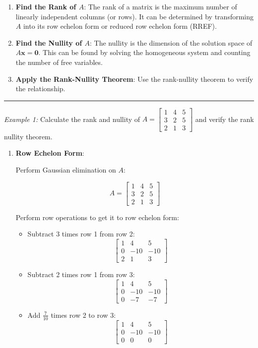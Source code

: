 \documentclass[
  letterpaper,
  DIV=11,
  numbers=noendperiod]{scrreprt}
\theoremstyle{plain}
\theoremstyle{definition}
\theoremstyle{remark}
\begin{document}
\begin{tcolorbox}
\begin{enumerate}
\def\labelenumi{\arabic{enumi}.}
\item
  \textbf{Find the Rank of \(A\)}: The rank of a matrix is the maximum
  number of linearly independent columns (or rows). It can be determined
  by transforming \(A\) into its row echelon form or reduced row echelon
  form (RREF).
\item
  \textbf{Find the Nullity of \(A\)}: The nullity is the dimension of
  the solution space of \(A \mathbf{x} = \mathbf{0}\). This can be found
  by solving the homogeneous system and counting the number of free
  variables.
\item
  \textbf{Apply the Rank-Nullity Theorem}: Use the rank-nullity theorem
  to verify the relationship.
\end{enumerate}

\begin{center}\rule{0.5\linewidth}{0.5pt}\end{center}

\emph{Example 1:} Calculate the rank and nullity of \(A=\begin{bmatrix}
   1 & 4 & 5 \\
   3 & 2 & 5 \\
   2 & 1 & 3
   \end{bmatrix}\) and verify the rank nullity theorem.

\begin{enumerate}
\def\labelenumi{\arabic{enumi}.}
\item
  \textbf{Row Echelon Form}:

  Perform Gaussian elimination on \(A\):

  \[A = \begin{bmatrix}
  1 & 4 & 5 \\
  3 & 2 & 5 \\
  2 & 1 & 3
  \end{bmatrix}\]

  Perform row operations to get it to row echelon form:

  \begin{itemize}
  \item
    Subtract 3 times row 1 from row 2: \[\begin{bmatrix}
    1 & 4 & 5 \\
    0 & -10 & -10 \\
    2 & 1 & 3
    \end{bmatrix}\]
  \item
    Subtract 2 times row 1 from row 3: \[\begin{bmatrix}
    1 & 4 & 5 \\
    0 & -10 & -10 \\
    0 & -7 & -7
    \end{bmatrix}\]
  \item
    Add \(\frac{7}{10}\) times row 2 to row 3: \[\begin{bmatrix}
    1 & 4 & 5 \\
    0 & -10 & -10 \\
    0 & 0 & 0
    \end{bmatrix}\]
  \end{itemize}


\end{enumerate}
\end{tcolorbox}
\end{document}
